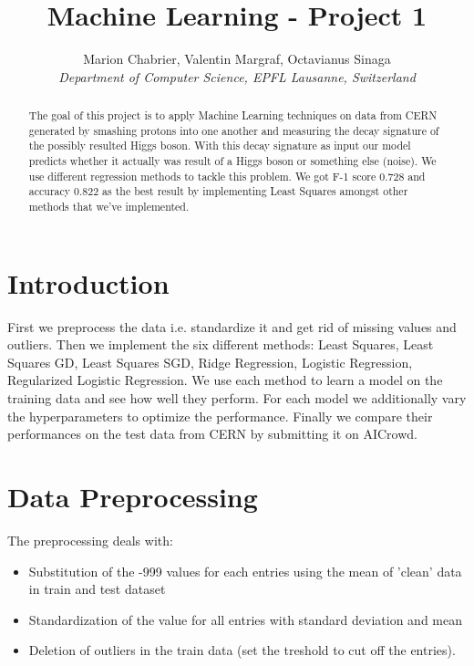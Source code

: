 \documentclass[10pt,conference,compsocconf]{IEEEtran}
\begin{document}
\title{Machine Learning - Project 1}

\author{
  Marion Chabrier, Valentin Margraf, Octavianus Sinaga\\
  \textit{Department of Computer Science, EPFL Lausanne, Switzerland}
}

\maketitle

\begin{abstract}
The goal of this project is to apply Machine Learning techniques on data from CERN generated by smashing protons into one another and measuring the decay signature of the possibly resulted Higgs boson. With this decay signature as input our model predicts whether it actually was result of a Higgs boson or something else (noise). We use different regression methods to tackle this problem. We got F-1 score 0.728 and accuracy 0.822 as the best result by implementing Least Squares amongst other methods that we've	 implemented.
\end{abstract}

\section{Introduction}
First we preprocess the data i.e. standardize it and get rid of missing values and outliers.
Then we implement the six different methods: Least Squares, Least Squares GD, Least Squares SGD, Ridge Regression, Logistic Regression, Regularized Logistic Regression. We use each method to learn a model on the training data and see how well they perform. For each model we additionally vary the hyperparameters to optimize the performance. Finally we compare their performances on the test data from CERN by submitting it on AICrowd.



\section{Data Preprocessing}
\label{sec:prepro}
The preprocessing deals with:
\begin{itemize}
	\item Substitution of the -999 values for each entries using the mean of 'clean' data in train and test dataset
	\item Standardization of the value for all entries with standard deviation and mean
	\item Deletion of outliers in the train data (set the treshold to cut off the entries).
\end{itemize}
\end{document}
